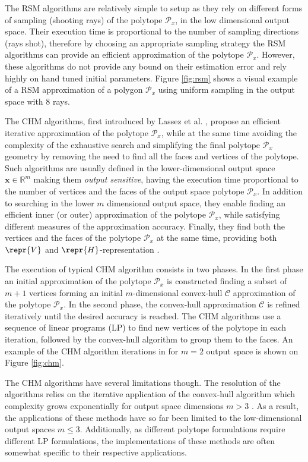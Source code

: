 The RSM algorithms are relatively simple to setup as they rely on different forms of sampling (shooting rays) of the polytope $\mathcal{P}_x$, in the low dimensional output space. Their execution time is proportional to the number of sampling directions (rays shot), therefore by choosing an appropriate sampling strategy the RSM algorithms can provide an efficient approximation of the polytope $\mathcal{P}_x$. However, these algorithms do not provide any bound on their estimation error and rely highly on hand tuned initial parameters. Figure \ref{fig:rsm} shows a visual example of a RSM approximation of a polygon $\mathcal{P}_x$ using uniform sampling in the output space with 8 rays.

The CHM algorithms, first introduced by Lassez et al. \cite{lassez1992quantifier, Huynh2005PracticalIO}, propose an efficient iterative approximation of the polytope $\mathcal{P}_x$, while at the same time avoiding the complexity of the exhaustive search and simplifying the final polytope $\mathcal{P}_x$ geometry by removing the need to find all the faces and vertices of the polytope. Such algorithms are usually defined in the lower-dimensional output space $\bm{x}\in \mathbb{R}^m$ making them \textit{output sensitive}, having the execution time proportional to the number of vertices and the faces of the output space polytope $\mathcal{P}_x$. In addition to searching in the lower $m$ dimensional output space, they enable finding an efficient inner (or outer) approximation of the polytope $\mathcal{P}_x$, while satisfying different measures of the approximation accuracy. Finally, they find both the vertices and the faces of the polytope $\mathcal{P}_x$ at the same time, providing both $\repr{V}$ and $\repr{H}$-representation \cite{Gl_le_2018}.


The execution of typical CHM algorithm consists in two phases. In the first phase an initial approximation of the polytope $\mathcal{P}_x$ is constructed finding a subset of $m+1$ vertices forming an initial $m$-dimensional convex-hull $\mathcal{C}$ approximation of the polytope $\mathcal{P}_x$. In the second phase, the convex-hull approximation $\mathcal{C}$ is refined iteratively until the desired accuracy is reached. The CHM algorithms use a sequence of linear programs (LP) to find new vertices of the polytope in each iteration, followed by the convex-hull algorithm to group them to the faces. An example of the CHM algorithm iterations in for $m=2$ output space is shown on Figure \ref{fig:chm}.   

The CHM algorithms have several limitations though. The resolution of the algorithms relies on the iterative application of the convex-hull algorithm which complexity grows exponentially for output space dimensions $m > 3$ \cite{Barber1996}. As a result, the applications of these methods have so far been limited to the low-dimensional output spaces $m\leq3$. Additionally, as different polytope formulations require different LP formulations, the implementations of these methods are often somewhat specific to their respective applications. 

